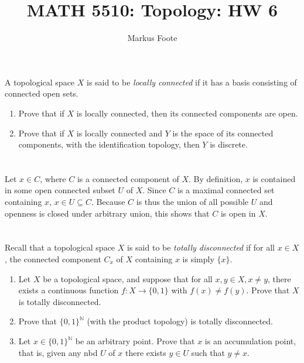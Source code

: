 \documentclass{jhwhw}
\title{MATH 5510: Topology: HW 6}
\author{Markus Foote}
\newcommand{\N}{{\mathbb N}}
\begin{document}
\problem{}%
A topological space $X$ is said to be \emph{locally connected} if it has a basis consisting of connected open sets.
\begin{enumerate}
	\item Prove that if $X$ is locally connected, then its connected components are open.
	\item Prove that if $X$ is locally connected and $Y$ is the space of its connected components, with the identification topology, then $Y$ is discrete.
\end{enumerate}
\solution{}
\part{}%
Let $x\in C$, where $C$ is a connected component of $X$. By definition, $x$ is contained in some open connected subset $U$ of $X$. Since $C$ is a maximal connected set containing $x$, $x\in U\subseteq C$. Because $C$ is thus the union of all possible $U$ and openness is closed under arbitrary union, this shows that $C$ is open in $X$.
\part{}%


\problem{} %
Recall that a topological space $X$ is said to be \emph{totally disconnected} if for all $x\in X$, the connected component $C_x$ of $X$ containing $x$ is simply $\{x\}$.  %
\begin{enumerate}
	
	\item Let $X$ be a topological space, and suppose that for all $x,y \in X, x\ne y$, there exists a continuous  function $f:X\to \{0,1\}$ with $f(x)\ne f(y)$. Prove that $X$ is totally disconnected.
	
	
	\item Prove that $\{0,1\}^\N$ (with the product topology) is totally disconnected.
	
	\item Let $ x \in \{0,1\}^\N$ be an arbitrary point.  Prove that $x$ is an accumulation point, that is, given any nbd $U $ of $x$ there exists $y\in U$ such that $y\ne x$.  
\end{enumerate}
\solution{}
\part{}%
\end{document}
